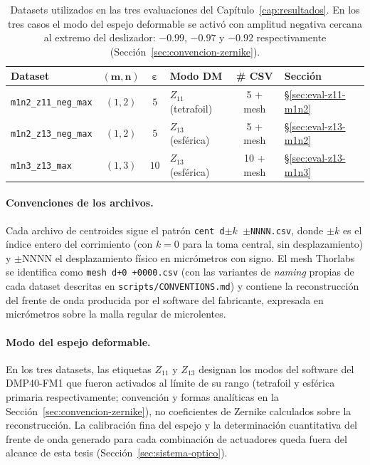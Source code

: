 \documentclass[letterpaper,12pt,oneside]{book}
\begin{document}
\begin{table}[htbp]
\centering
\caption{Datasets utilizados en las tres evaluaciones del Capítulo~\ref{cap:resultados}.
En los tres casos el modo del espejo deformable se activó con amplitud negativa cercana al
extremo del deslizador: $-0.99$, $-0.97$ y $-0.92$ respectivamente
(Sección~\ref{sec:convencion-zernike}).}
\label{tab:ap-datasets}
\small
\begin{tabular}{lcclcl}
\hline
\textbf{Dataset} & $\boldsymbol{(m,n)}$ & $\boldsymbol{\varepsilon}$ & \textbf{Modo DM} & \textbf{\# CSV} & \textbf{Sección} \\
\hline
\texttt{m1n2\_z11\_neg\_max} & $(1,2)$ & $5$  & $Z_{11}$ (tetrafoil) & 5 + mesh  & §\ref{sec:eval-z11-m1n2} \\
\texttt{m1n2\_z13\_neg\_max} & $(1,2)$ & $5$  & $Z_{13}$ (esférica)  & 5 + mesh  & §\ref{sec:eval-z13-m1n2} \\
\texttt{m1n3\_z13\_max}      & $(1,3)$ & $10$ & $Z_{13}$ (esférica)  & 10 + mesh & §\ref{sec:eval-z13-m1n3} \\
\hline
\end{tabular}
\end{table}

\paragraph{Convenciones de los archivos.} Cada archivo de centroides sigue el patrón
\texttt{cent d}$\pm k$\texttt{ }$\pm$\texttt{NNNN.csv}, donde $\pm k$ es el índice entero
del corrimiento (con $k = 0$ para la toma central, sin desplazamiento) y $\pm$NNNN el
desplazamiento físico en micrómetros con signo. El mesh Thorlabs se identifica como
\texttt{mesh d+0 +0000.csv} (con las variantes de \textit{naming} propias de cada dataset
descritas en \texttt{scripts/CONVENTIONS.md}) y contiene la reconstrucción del frente de
onda producida por el software del fabricante, expresada en micrómetros sobre la malla
regular de microlentes.

\paragraph{Modo del espejo deformable.} En los tres datasets, las etiquetas $Z_{11}$ y
$Z_{13}$ designan los modos del software del DMP40-FM1 que fueron activados al límite de
su rango (tetrafoil y esférica primaria respectivamente; convención y formas analíticas en
la Sección~\ref{sec:convencion-zernike}), no coeficientes de Zernike calculados sobre la
reconstrucción. La calibración fina del espejo y la determinación cuantitativa del frente
de onda generado para cada combinación de actuadores queda fuera del alcance de esta tesis
(Sección~\ref{sec:sistema-optico}).
\end{document}
